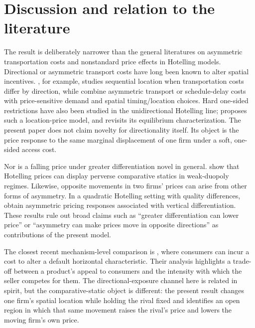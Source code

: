 \section{Discussion and relation to the literature}\label{sec:literature}

The result is deliberately narrower than the general literatures on asymmetric transportation costs and nonstandard price effects in Hotelling models. Directional or asymmetric transport costs have long been known to alter spatial incentives. \citet{Nilssen1997}, for example, studies sequential location when transportation costs differ by direction, while \citet{VanderWeijdeVerhoefVandenBerg2014} combine asymmetric transport or schedule-delay costs with price-sensitive demand and spatial timing/location choices. Hard one-sided restrictions have also been studied in the unidirectional Hotelling line; \citet{Kharbach2009} proposes such a location-price model, and \citet{EbinaShimizu2012} revisits its equilibrium characterization. The present paper does not claim novelty for directionality itself. Its object is the price response to the same marginal displacement of one firm under a soft, one-sided access cost.

Nor is a falling price under greater differentiation novel in general. \citet{MerelSexton2010} show that Hotelling prices can display perverse comparative statics in weak-duopoly regimes. Likewise, opposite movements in two firms' prices can arise from other forms of asymmetry. In a quadratic Hotelling setting with quality differences, \citet{CohenHeifetz2024} obtain asymmetric pricing responses associated with vertical differentiation. These results rule out broad claims such as ``greater differentiation can lower price'' or ``asymmetry can make prices move in opposite directions'' as contributions of the present model.

The closest recent mechanism-level comparison is \citet{ChakravortySappington2026}, where consumers can incur a cost to alter a default horizontal characteristic. Their analysis highlights a trade-off between a product's appeal to consumers and the intensity with which the seller competes for them. The directional-exposure channel here is related in spirit, but the comparative-static object is different: the present result changes one firm's spatial location while holding the rival fixed and identifies an open region in which that same movement raises the rival's price and lowers the moving firm's own price.

